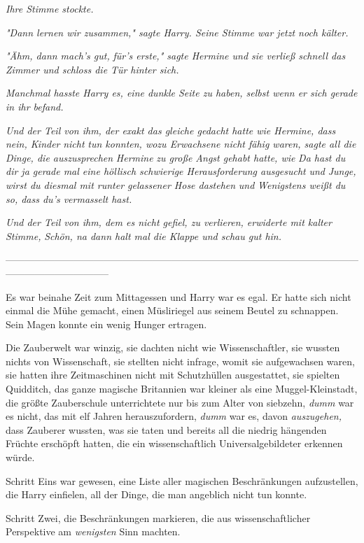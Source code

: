 {\emph{Ihre Stimme stockte.}

\emph{"Dann lernen wir zusammen," sagte Harry. Seine Stimme war jetzt noch kälter.}

\emph{"Ähm, dann mach's gut,} \emph{für's erste," sagte Hermine und sie verließ schnell das Zimmer und schloss die Tür hinter sich.}

\emph{Manchmal hasste Harry es, eine dunkle Seite zu haben, selbst wenn er sich gerade in ihr befand.}

\emph{Und der Teil von ihm, der exakt das gleiche gedacht hatte wie Hermine, dass nein, Kinder} \emph{\emph{nicht}} \emph{tun konnten, wozu Erwachsene nicht fähig waren, sagte all die Dinge, die auszusprechen} \emph{Hermine} \emph{zu große Angst gehabt hatte, wie} \emph{\emph{Da hast du dir ja gerade mal eine höllisch schwierige Herausforderung ausgesucht}} \emph{und} \emph{\emph{Junge, wirst du diesmal mit runter gelassener Hose dastehen}} \emph{und} \emph{\emph{Wenigstens weißt du so, dass du's vermasselt hast.}}

\emph{Und der Teil von ihm, dem es nicht gefiel, zu verlieren, erwiderte mit kalter Stimme,} \emph{\emph{Schön, na dann halt mal die Klappe und schau gut hin.}}

--------------------------------------------------------------------------------------------------------------------------------------------

Es war beinahe Zeit zum Mittagessen und Harry war es egal. Er hatte sich nicht einmal die Mühe gemacht, einen Müsliriegel aus seinem Beutel zu schnappen. Sein Magen konnte ein wenig Hunger ertragen.

Die Zauberwelt war winzig, sie dachten nicht wie Wissenschaftler, sie wussten nichts von Wissenschaft, sie stellten nicht infrage, womit sie aufgewachsen waren, sie hatten ihre Zeitmaschinen nicht mit Schutzhüllen ausgestattet, sie spielten Quidditch, das ganze magische Britannien war kleiner als eine Muggel-Kleinstadt, die größte Zauberschule unterrichtete nur bis zum Alter von siebzehn, \emph{dumm} war es nicht, das mit elf Jahren herauszufordern, \emph{dumm} war es, davon \emph{auszugehen,} dass Zauberer wussten, was sie taten und bereits all die niedrig hängenden Früchte erschöpft hatten, die ein wissenschaftlich Universalgebildeter erkennen würde.

Schritt Eins war gewesen, eine Liste aller magischen Beschränkungen aufzustellen, die Harry einfielen, all der Dinge, die man angeblich nicht tun konnte.

Schritt Zwei, die Beschränkungen markieren, die aus wissenschaftlicher Perspektive am \emph{wenigsten} Sinn machten.

}
